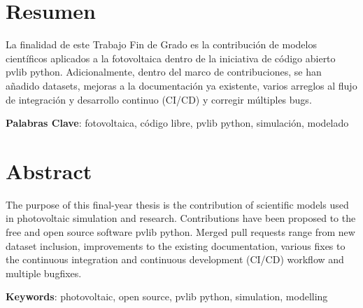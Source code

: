 \chapter*{Resumen} \label{chp:abstract}

La finalidad de este Trabajo Fin de Grado es la contribución de modelos científicos aplicados a la fotovoltaica dentro de la iniciativa de código abierto pvlib python. Adicionalmente, dentro del marco de contribuciones, se han añadido datasets, mejoras a la documentación ya existente, varios arreglos al flujo de integración y desarrollo continuo (CI/CD) y corregir múltiples bugs.

\textbf{Palabras Clave}: fotovoltaica, código libre, pvlib python, simulación, modelado


\newpage


\chapter*{Abstract}

The purpose of this final-year thesis is the contribution of scientific models used in photovoltaic simulation and research. Contributions have been proposed to the free and open source software pvlib python. Merged pull requests range from new dataset inclusion, improvements to the existing documentation, various fixes to the continuous integration and continuous development (CI/CD) workflow and multiple bugfixes.

\textbf{Keywords}: photovoltaic, open source, pvlib python, simulation, modelling
